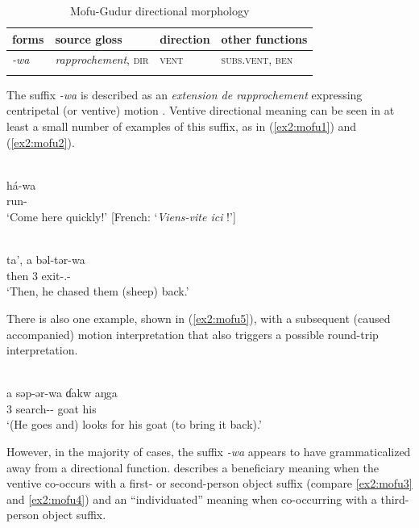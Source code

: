 \begin{table}[H]
	\caption{Mofu-Gudur directional morphology}
	\label{tab:mofu}
	\begin{tabular}{llll} %
		\lsptoprule
		forms & source gloss & direction  & other functions  \\ %
		\midrule
		\textit{-wa}  &  \textit{rapprochement}, \textsc{dir}  &  \textsc{vent} &  \textsc{subs.vent}, \textsc{ben}  \\
		\lspbottomrule
	\end{tabular}
\end{table} 

The suffix \textit{-wa} is described as an \textit{extension de rapprochement} expressing centripetal (or ventive) motion \citep[424]{barreteauDescriptionMofuGudurLangue1983}. Ventive directional meaning can be seen in at least a small number of examples of this suffix, as in (\ref{ex2:mofu1}) and (\ref{ex2:mofu2}). 

\ea\label{ex2:mofu1}
 \\
\gll há-wa \\
run- \\
\glt `Come here quickly!' [French: `\textit{Viens-vite ici} !']

\ex\label{ex2:mofu2}
 \\
\gll ta', a bəl-tər-wa \\
then 3 exit-.- \\
\glt `Then, he chased them (sheep) back.'
\z 

There is also one example, shown in (\ref{ex2:mofu5}), with a subsequent (caused accompanied) motion interpretation that also triggers a possible round-trip interpretation.

\ea\label{ex2:mofu5}
 \\
\gll  a səp-ər-wa ɗakw aŋga	\\
3 search-- goat his		\\
\glt `(He goes and) looks for his goat (to bring it back).'
\z 

However, in the majority of cases, the suffix \textit{-wa} appears to have grammaticalized away from a directional function. \citet[8, 10]{hollingsworthTransitivityPragmaticsObject1995} describes a beneficiary meaning when the ventive co-occurs with a first- or second-person object suffix (compare \ref{ex2:mofu3} and \ref{ex2:mofu4}) and an ``individuated'' meaning when co-occurring with a third-person object suffix. 

